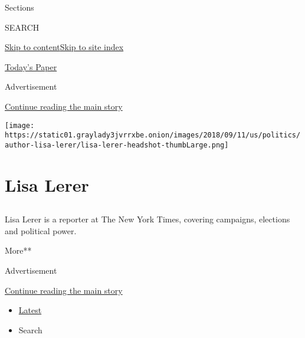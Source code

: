Sections

SEARCH

\protect\hyperlink{site-content}{Skip to
content}\protect\hyperlink{site-index}{Skip to site index}

\href{https://myaccount.nytimes3xbfgragh.onion/auth/login?response_type=cookie\&client_id=vi}{}

\href{https://www.nytimes3xbfgragh.onion/section/todayspaper}{Today's
Paper}

Advertisement

\protect\hyperlink{after-top}{Continue reading the main story}

\texttt{[image: https://static01.graylady3jvrrxbe.onion/images/2018/09/11/us/politics/author-lisa-lerer/lisa-lerer-headshot-thumbLarge.png]}

\hypertarget{lisa-lerer}{%
\section{Lisa Lerer}\label{lisa-lerer}}

\hypertarget{section}{%
\subsection{}\label{section}}

Lisa Lerer is a reporter at The New York Times, covering campaigns,
elections and political power.

More**

Advertisement

\protect\hyperlink{after-mid1}{Continue reading the main story}

\begin{itemize}
\tightlist
\item
  \protect\hyperlink{stream-panel}{Latest}
\item
  Search
\end{itemize}

